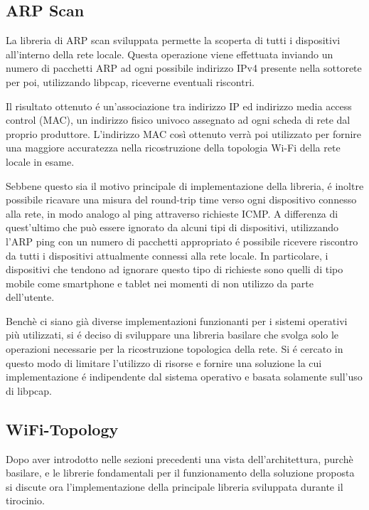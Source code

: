 
\subsection{ARP Scan}

La libreria di ARP scan sviluppata permette la scoperta di tutti i dispositivi all'interno della rete locale.
Questa operazione viene effettuata inviando un numero di pacchetti ARP ad ogni possibile indirizzo IPv4 presente nella sottorete per poi, utilizzando libpcap, riceverne eventuali riscontri.

Il risultato ottenuto \'e un'associazione tra indirizzo IP ed indirizzo media access control (MAC), un indirizzo fisico univoco assegnato ad ogni scheda di rete dal proprio produttore.
L'indirizzo MAC cos\`i ottenuto verr\`a poi utilizzato per fornire una maggiore accuratezza nella ricostruzione della topologia Wi-Fi della rete locale in esame.

Sebbene questo sia il motivo principale di implementazione della libreria, \'e inoltre possibile ricavare una misura del round-trip time verso ogni dispositivo connesso alla rete, in modo analogo al ping attraverso richieste ICMP.
A differenza di quest'ultimo che pu\`o essere ignorato da alcuni tipi di dispositivi, utilizzando l'ARP ping con un numero di pacchetti appropriato \'e possibile ricevere riscontro da tutti i dispositivi attualmente connessi alla rete locale.
In particolare, i dispositivi che tendono ad ignorare questo tipo di richieste sono quelli di tipo mobile come smartphone e tablet nei momenti di non utilizzo da parte dell'utente.

Bench\`e ci siano gi\`a diverse implementazioni funzionanti per i sistemi operativi pi\`u utilizzati, si \'e deciso di sviluppare una libreria basilare che svolga solo le operazioni necessarie per la ricostruzione topologica della rete.
Si \'e cercato  in questo modo di limitare l'utilizzo di risorse e fornire una soluzione la cui implementazione \'e indipendente dal sistema operativo e basata solamente sull'uso di libpcap.

\newpage



\subsection{WiFi-Topology}
Dopo aver introdotto nelle sezioni precedenti una vista dell'architettura, purch\`e basilare, e le librerie fondamentali per il funzionamento della soluzione proposta si discute ora l'implementazione della principale libreria sviluppata durante il tirocinio.

